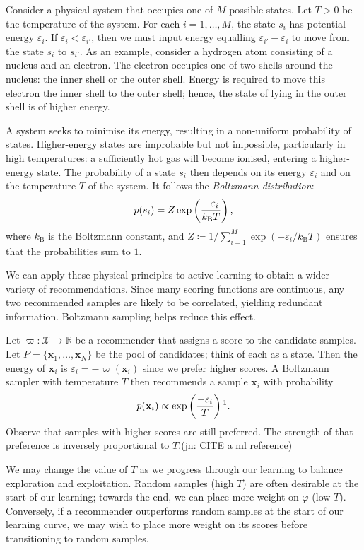 \documentclass[11pt,twoside,openright]{report}
\newcommand\bbR{\mathbb{R}}
\newcommand\bx{\mathbf{x}}
\newcommand\cX{\mathcal{X}}
\newcommand\jn[1]{{\color{red}(jn: #1)}}
\begin{document}
Consider a physical system that occupies one of $M$ possible states. Let $T > 0$ be the temperature of the system. For each $i=1, \dots, M$, the state $s_i$ has potential energy $\varepsilon_i$. If $\varepsilon_i < \varepsilon_{i'}$, then we must input energy equalling $\varepsilon_{i'} - \varepsilon_i$ to move from the state $s_i$ to $s_{i'}$. As an example, consider a hydrogen atom consisting of a nucleus and an electron. The electron occupies one of two shells around the nucleus: the inner shell or the outer shell. Energy is required to move this electron the inner shell to the outer shell; hence, the state of lying in the outer shell is of higher energy.

A system seeks to minimise its energy, resulting in a non-uniform probability of states. Higher-energy states are improbable but not impossible, particularly in high temperatures: a sufficiently hot gas will become ionised, entering a higher-energy state. The probability of a state $s_i$ then depends on its energy $\varepsilon_i$ and on the temperature $T$ of the system. It follows the \textit{Boltzmann distribution}:\[
  p(s_i) = Z\exp\left(\frac{-\varepsilon_i}{k_\mathrm{B}T}\right) \text,
\] where $k_\mathrm{B}$ is the Boltzmann constant, and $Z \coloneqq 1/\sum^{M}_{i=1}\exp(-\varepsilon_i/k_\mathrm{B}T)$ ensures that the probabilities sum to $1$. \citep{Schroeder}

We can apply these physical principles to active learning to obtain a wider variety of recommendations. Since many scoring functions are continuous, any two recommended samples are likely to be correlated, yielding redundant information. Boltzmann sampling helps reduce this effect.

Let $\varpi : \cX \to \bbR$ be a recommender that assigns a score to the candidate samples. Let $P = \{\bx_1, \dots, \bx_N\}$ be the pool of candidates; think of each as a state. Then the energy of $\bx_i$ is $\varepsilon_i = -\varpi(\bx_i)$ since we prefer higher scores. A Boltzmann sampler with temperature $T$ then recommends a sample $\bx_i$ with probability \[
  p(\bx_i) \propto \exp\left(\frac{-\varepsilon_i}{T}\right) \text{\footnotemark}.
\]Observe that samples with higher scores are still preferred. The strength of that preference is inversely proportional to $T$.\jn{CITE a ml reference}

We may change the value of $T$ as we progress through our learning to balance exploration and exploitation. Random samples (high $T$) are often desirable at the start of our learning; towards the end, we can place more weight on $\varphi$ (low $T$). Conversely, if a recommender outperforms random samples at the start of our learning curve, we may wish to place more weight on its scores before transitioning to random samples.
\end{document}
